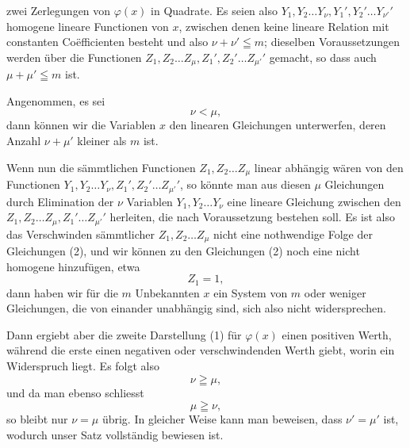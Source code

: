 zwei Zerlegungen von $\varphi(x)$ in Quadrate. Es seien also $Y_1, Y_2 \ldots Y_\nu, Y_1', Y_2' \ldots Y_{\nu'}'$ homogene lineare Functionen von $x$, zwischen denen keine lineare Relation mit constanten Co\"efficienten besteht und also $\nu + \nu' \leqq m$; dieselben Voraussetzungen werden über die Functionen $Z_1, Z_2 \ldots Z_\mu, Z_1', Z_2' \ldots Z_{\mu'}'$ gemacht, so dass auch $\mu + \mu' \leqq m$ ist.

Angenommen, es sei
\[
\nu < \mu,
\]
dann können wir die Variablen $x$ den linearen Gleichungen
unterwerfen, deren Anzahl $\nu + \mu'$ kleiner als $m$ ist.

Wenn nun die sämmtlichen Functionen $Z_1, Z_2 \ldots Z_\mu$ linear abhängig wären von den Functionen $Y_1, Y_2 \ldots Y_\nu, Z_1', Z_2' \ldots Z_{\mu'}'$, so könnte man aus diesen $\mu$ Gleichungen durch Elimination der $\nu$ Variablen $Y_1, Y_2 \ldots Y_\nu$ eine lineare Gleichung zwischen den $Z_1, Z_2 \ldots Z_\mu, Z_1' \ldots Z_{\mu'}'$ herleiten, die nach Voraussetzung  bestehen soll. Es ist also das Verschwinden sämmtlicher $Z_1, Z_2 \ldots Z_\mu$ nicht eine nothwendige Folge der Gleichungen (2), und wir können zu den Gleichungen (2) noch eine nicht homogene hinzufügen, etwa
\[
Z_1 = 1,
\]
dann haben wir für die $m$ Unbekannten $x$ ein System von $m$ oder weniger Gleichungen, die von einander unabhängig sind, sich also nicht widersprechen.

Dann ergiebt aber die zweite Darstellung (1) für $\varphi(x)$ einen positiven Werth, während die erste einen negativen oder verschwindenden Werth giebt, worin ein Widerspruch liegt. Es folgt also
\[
\nu \geqq \mu,
\]
und da man ebenso schliesst
\[
\mu \geqq \nu,
\]
so bleibt nur $\nu = \mu$ übrig. In gleicher Weise kann man beweisen, dass $\nu' = \mu'$ ist, wodurch unser Satz vollständig bewiesen ist.
